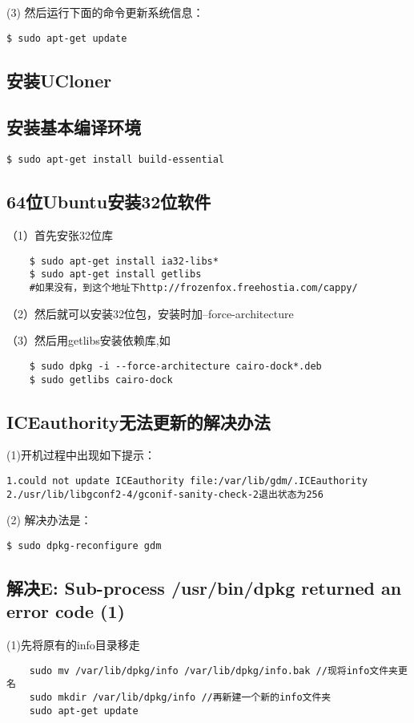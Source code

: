 (3) 然后运行下面的命令更新系统信息：

\verb"$ sudo apt-get update"

\subsection{安装UCloner}

\subsection{安装基本编译环境}

\verb"$ sudo apt-get install build-essential"

\subsection{64位Ubuntu安装32位软件}
（1）首先安张32位库

\begin{verbatim}
	$ sudo apt-get install ia32-libs*
	$ sudo apt-get install getlibs 
	#如果没有，到这个地址下http://frozenfox.freehostia.com/cappy/
\end{verbatim}

（2）然后就可以安装32位包，安装时加--force-architecture

（3）然后用getlibs安装依赖库,如
\begin{verbatim}
	$ sudo dpkg -i --force-architecture cairo-dock*.deb
	$ sudo getlibs cairo-dock
\end{verbatim}

\subsection{ICEauthority无法更新的解决办法}
(1)开机过程中出现如下提示：
\begin{verbatim}
1.could not update ICEauthority file:/var/lib/gdm/.ICEauthority
2./usr/lib/libgconf2-4/gconif-sanity-check-2退出状态为256
\end{verbatim}

(2) 解决办法是：

\verb"$ sudo dpkg-reconfigure gdm"

\subsection{解决E: Sub-process /usr/bin/dpkg returned an error code (1)}
(1)先将原有的info目录移走
\begin{verbatim}
    sudo mv /var/lib/dpkg/info /var/lib/dpkg/info.bak //现将info文件夹更名
    sudo mkdir /var/lib/dpkg/info //再新建一个新的info文件夹
    sudo apt-get update
\end{verbatim}

